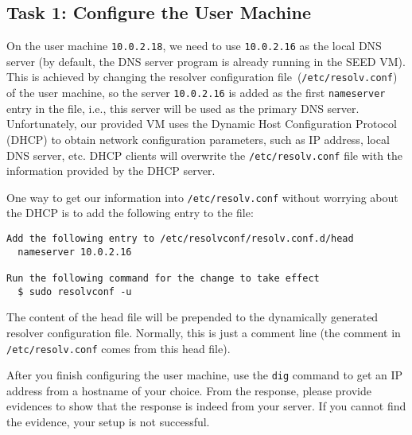 \subsection{Task 1: Configure the User Machine}

On the user machine {\tt 10.0.2.18}, we need to use
{\tt 10.0.2.16} as the local DNS server (by default, 
the DNS server program is already running in the SEED VM). This is achieved by changing
the resolver configuration file~(\texttt{/etc/resolv.conf}) of the user machine, 
so the server \texttt{10.0.2.16} is added as the first \texttt{nameserver} entry in the file, i.e.,
this server will be used as the primary DNS server.
Unfortunately, our provided VM uses the Dynamic Host Configuration Protocol (DHCP) to obtain
network configuration parameters, such as IP address, local DNS server, etc.
DHCP clients will overwrite the \texttt{/etc/resolv.conf} file with the information
provided by the DHCP server. 

One way to get our information into \texttt{/etc/resolv.conf} without worrying about
the DHCP is to add the following entry to the 
file:

\begin{lstlisting}
Add the following entry to /etc/resolvconf/resolv.conf.d/head
  nameserver 10.0.2.16

Run the following command for the change to take effect
  $ sudo resolvconf -u
\end{lstlisting}
 
The content of the head file will be prepended to the dynamically generated resolver
configuration file. Normally, this is just a comment line (the comment in
\texttt{/etc/resolv.conf} comes from this head file).


After you finish configuring the user machine, use the \texttt{dig} command
to get an IP address from a hostname of your choice. From the response, please provide
evidences to show that the response is indeed from your server. If you cannot find the
evidence, your setup is not successful. 


